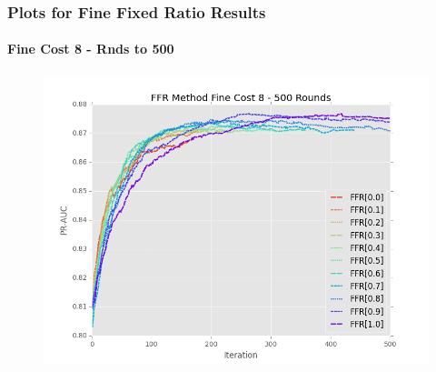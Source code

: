 \documentclass{beamer}
\begin{document}
\begin{frame}[noframenumbering]
    \frametitle{Plots for Fine Fixed Ratio Results}  %
    \framesubtitle{Fine Cost 8 - Rnds to 500}
    \begin{figure}[!htb]
        \centering
        \includegraphics[width=0.8\columnwidth]{fig/ParamsFFR_PR_Cost8_rnds0_500}
        \label{fig:ParamsFFR_PR_Cost8_rnds0_500}
    \end{figure}
\end{frame}
\end{document}
